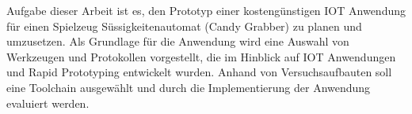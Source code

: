 \documentclass[BMR,Bachelor,ngerman]{twbook}%
\begin{document}
%
Aufgabe dieser Arbeit ist es, den Prototyp einer kostengünstigen \ac{IOT} Anwendung für einen Spielzeug Süssigkeitenautomat (Candy Grabber) zu planen und umzusetzen. Als Grundlage für die Anwendung wird eine Auswahl von Werkzeugen und Protokollen vorgestellt, die im Hinblick auf \ac{IOT} Anwendungen und Rapid Prototyping entwickelt wurden. Anhand von Versuchsaufbauten soll eine Toolchain ausgewählt und durch die Implementierung der Anwendung evaluiert werden.

\clearpage
\end{document}
